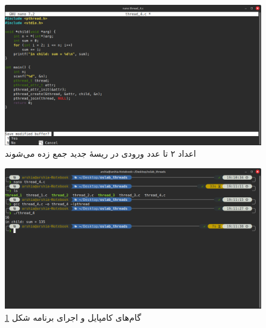 \documentclass[12pt]{article}
\begin{document}
	\begin{figure}[H]
		\centering
		\includegraphics[width=\textwidth]{report7-resources/7.png}
		\caption{اعداد ۲ تا عدد ورودی در ریسهٔ جدید جمع زده می‌شوند}
		\label{img:7}
	\end{figure}
	\begin{figure}[H]
		\centering
		\includegraphics[width=\textwidth]{report7-resources/8.png}
		\caption{گام‌های کامپایل و اجرای برنامه شکل \ref{img:7}}
		\label{img:8}
	\end{figure}
	\newpage
\end{document}
